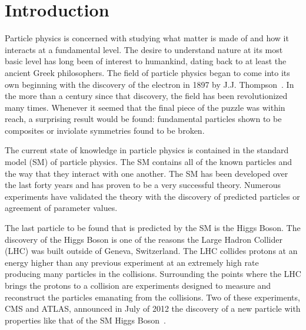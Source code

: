 \chapter{Introduction}

Particle physics is concerned with studying what matter is made of and how it interacts at a fundamental level.
The desire to understand nature at its most basic level has long been of interest to humankind, dating back to at least the ancient Greek philosophers.
The field of particle physics began to come into its own beginning with the discovery of the electron in 1897 by J.J. Thompson~\cite{griffiths2008introduction}.
In the more than a century since that discovery, the field has been revolutionized many times. Whenever it seemed that the final piece of the puzzle was within reach,
a surprising result would be found: fundamental particles shown to be composites or inviolate symmetries found to be broken.

The current state of knowledge in particle physics is contained in the standard model (SM) of particle physics. The SM contains all of the known
particles and the way that they interact with one another. The SM has been developed over the last forty years and has proven to be a very successful theory. 
Numerous experiments have validated the theory with the discovery of predicted particles or agreement of parameter values.

The last particle to be found that is predicted by the SM is the Higgs Boson.
The discovery of the Higgs Boson is one of the reasons the Large Hadron Collider (LHC) was built outside of Geneva, Switzerland. 
The LHC collides protons at an energy higher than any previous experiment at an extremely high rate~\cite{1748-0221-3-08-S08001}
producing many particles in the collisions.
Surrounding the points where the LHC brings the protons to a collision
are experiments designed to measure and reconstruct the particles emanating from the collisions. Two of these experiments, CMS and
ATLAS, announced in July of 2012 the discovery of a new particle with properties like that of the SM Higgs Boson~\cite{Chatrchyan:2012ufa, Aad:2012tfa}.

